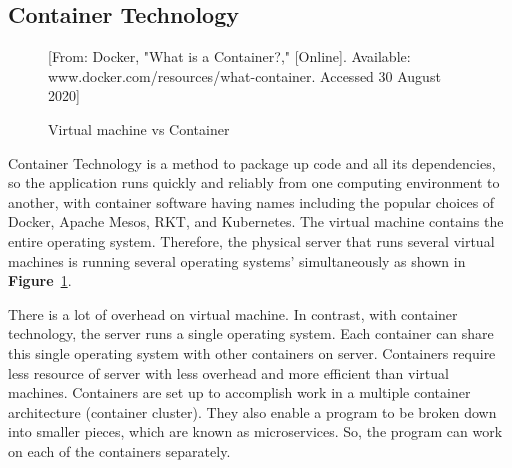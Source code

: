 \documentclass[12pt,oneside,openright,a4paper]{cpe-english-project}
\begin{document}
\newpage

\subsection{Container Technology}

\begin{figure}[!h]\centering
  \setlength{\fboxrule}{0mm} %
  \setlength{\fboxsep}{0cm}
  \caption{Virtual machine vs Container}\label{fig:vmVSContainer}
  [From: Docker, "What is a Container?," [Online]. Available: www.docker.com/resources/what-container. Accessed 30 August 2020]
\end{figure}

\hspace{10mm}Container Technology is a method to package up code and all its dependencies, so the application runs quickly and reliably from one computing environment to another, with container software having names including the popular choices of Docker, Apache Mesos, RKT, and Kubernetes.  The virtual machine contains the entire operating system.  Therefore, the physical server that runs several virtual machines is running several operating systems’ simultaneously as shown in \textbf{Figure}~\ref{fig:vmVSContainer}. \cite{docker}

\hspace{10mm}There is a lot of overhead on virtual machine.  In contrast, with container technology, the server runs a single operating system.  Each container can share this single operating system with other containers on server.  Containers require less resource of server with less overhead and more efficient than virtual machines. \cite{container}   Containers are set up to accomplish work in a multiple container architecture (container cluster).  They also enable a program to be broken down into smaller pieces, which are known as microservices.  So, the program can work on each of the containers separately.
\end{document}
